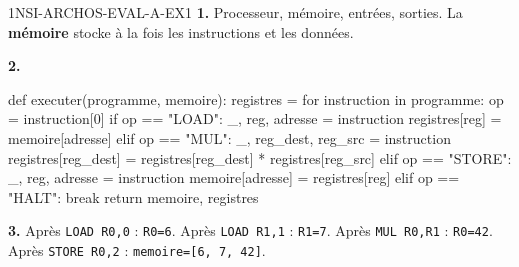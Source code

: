 \begin{corrige}{1NSI-ARCHOS-EVAL-A-EX1}
\textbf{1.} Processeur, mémoire, entrées, sorties. La \textbf{mémoire} stocke à la fois
les instructions et les données.

\textbf{2.}
\begin{python}
def executer(programme, memoire):
    registres = {}
    for instruction in programme:
        op = instruction[0]
        if op == "LOAD":
            _, reg, adresse = instruction
            registres[reg] = memoire[adresse]
        elif op == "MUL":
            _, reg_dest, reg_src = instruction
            registres[reg_dest] = registres[reg_dest] * registres[reg_src]
        elif op == "STORE":
            _, reg, adresse = instruction
            memoire[adresse] = registres[reg]
        elif op == "HALT":
            break
    return memoire, registres
\end{python}

\textbf{3.} Après \lstinline{LOAD R0,0} : \lstinline{R0=6}. Après \lstinline{LOAD R1,1} :
\lstinline{R1=7}. Après \lstinline{MUL R0,R1} : \lstinline{R0=42}. Après
\lstinline{STORE R0,2} : \lstinline{memoire=[6, 7, 42]}.
\end{corrige}

